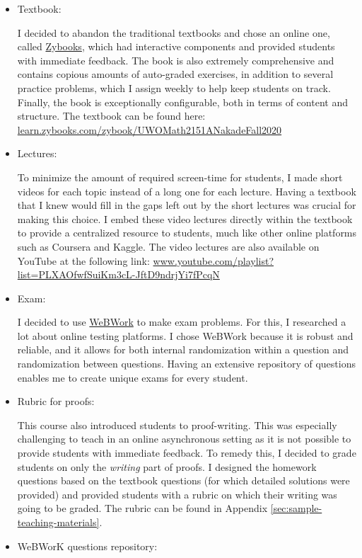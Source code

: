 \documentclass[
]{report}
\begin{document}
\begin{itemize}
\item
  Textbook:

  I decided to abandon the traditional textbooks and chose an online one, called \href{https://learn.zybooks.com/zybook/UWOMath2151ANakadeFall2020}{Zybooks}, which had interactive components and provided students with immediate feedback. The book is also extremely comprehensive and contains copious amounts of auto-graded exercises, in addition to several practice problems, which I assign weekly to help keep students on track. Finally, the book is exceptionally configurable, both in terms of content and structure.
  The textbook can be found here: \href{https://learn.zybooks.com/zybook/UWOMath2151ANakadeFall2020}{learn.zybooks.com/zybook/UWOMath2151ANakadeFall2020}
\item
  Lectures:

  To minimize the amount of required screen-time for students, I made short videos for each topic instead of a long one for each lecture. Having a textbook that I knew would fill in the gaps left out by the short lectures was crucial for making this choice. I embed these video lectures directly within the textbook to provide a centralized resource to students, much like other online platforms such as Coursera and Kaggle.
  The video lectures are also available on YouTube at the following link: \href{https://www.youtube.com/playlist?list=PLXAOfwfSuiKm3cL-JftD9ndrjYi7fPcqN}{www.youtube.com/playlist?list=PLXAOfwfSuiKm3cL-JftD9ndrjYi7fPcqN}
\item
  Exam:

  I decided to use \href{https://webwork.maa.org/}{WeBWork} to make exam problems.
  For this, I researched a lot about online testing platforms. I chose WeBWork because it is robust and reliable, and it allows for both internal randomization within a question and randomization between questions. Having an extensive repository of questions enables me to create unique exams for every student.
\item
  Rubric for proofs:

  This course also introduced students to proof-writing.
  This was especially challenging to teach in an online asynchronous setting as it is not possible to provide students with immediate feedback.
  To remedy this, I decided to grade students on only the \emph{writing} part of proofs.
  I designed the homework questions based on the textbook questions (for which detailed solutions were provided) and provided students with a rubric on which their writing was going to be graded.
  The rubric can be found in Appendix \ref{sec:sample-teaching-materials}.
\item
  WeBWorK questions repository:


\end{itemize}
\end{document}

